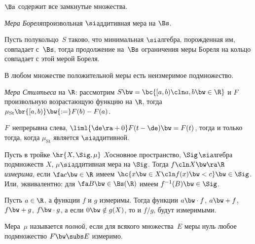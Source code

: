 \documentclass[a4paper,draft]{article}
\begin{document}
\begin{imp}
  $\Bs$ содержит все замкнутые множества.
\end{imp}

\begin{df}
  \emph{Мера Бореля}\т произвольная $\si$\д аддитивная мера на $\Bs$.
\end{df}

\begin{theorem}
  Пусть полукольцо~$S$ таково,
  что минимальная $\si$\д алгебра, порожденная им, совпадает с~$\Bs$, тогда
  продолжение на~$\Bs$ ограничения меры Бореля на кольцо совпадает с этой мерой Бореля.
\end{theorem}

\begin{stm}
  В любом множестве положительной меры есть неизмеримое подмножество.
\end{stm}

\begin{df}
  \emph{Мера Стилтьеса} на $\R$: рассмотрим $S \bw= \bc{[a,b)\cln a,b \bw\in \R}$ и $F$\т
  произвольную возрастающую функцию на $\R$,
  тогда $\mu_\mathrm{St} \br{[a,b)} \bw{:=} F(b)-F(a)$.
\end{df}

\begin{theorem}
  $F$~непрерывна слева,  $\liml{\de\ra+0} F(t-\de) \bw= F(t)$, тогда и только тогда,
  когда $\mu_\mathrm{St}$ является $\si$\д аддитивной.
\end{theorem}

\begin{df}
  Пусть в тройке $\hr{X,\Sig,\mu}$ $X$\т основное пространство, $\Sig$\т $\si$\д алгебра
  подмножеств $X$, $\mu$\т $\si$\д аддитивная мера на $\Sig$. Тогда $f\cln X \bw\ra \R$
  \emph{измерима}, если $\fa c \bw\in\R$ имеем $\hc{x \bw\in X\cln f(x)\bw< c} \bw\in \Sig$.
  Или, эквивалентно: для $\fa B \bw\in \Bs(\R)$ имеем $f^{-1}(B) \bw\in \Sig$.
\end{df}

\begin{stm}
  Пусть $a \in \R$, а функции $f$ и $g$ измеримы. Тогда функции $a \bw\cdot f$, $a \bw+ f$,
  $f \bw+ g$, $f \bw\cdot g$, а если $0 \bw\notin g(X)$, то и $f/g$, будут измеримыми.
\end{stm}

\begin{df}
  Мера~$\mu$ называется \emph{полной}, если для всякого множества~$E$ меры нуль любое
  подмножество $F \bw\subs E$ измеримо.
\end{df}
\end{document}
